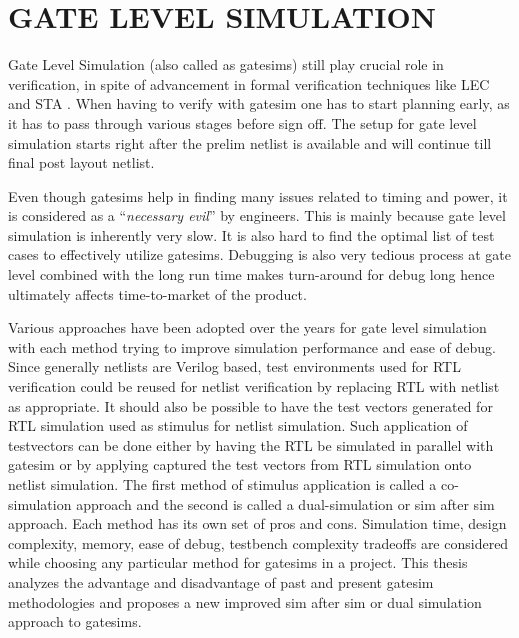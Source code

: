 \section{GATE LEVEL SIMULATION}

Gate Level Simulation (also called as gatesims) still play crucial role in verification, in spite of advancement in formal verification techniques like LEC  and STA .   When having to verify with gatesim one has to start planning early, as it has to pass through various stages before sign off. The setup for gate level simulation starts right after the prelim netlist is available and will continue till final post layout netlist.  

Even though gatesims help in finding many issues related to timing and power, it is considered as a ``{\it necessary evil}'' by engineers. This is mainly because gate level simulation is inherently very slow. It is also hard to find the optimal list of test cases to effectively utilize gatesims. Debugging is also very tedious process at gate level combined with the long run time makes turn-around for debug long hence ultimately affects time-to-market of the product.

Various approaches have been adopted over the years for gate level simulation with each method trying to improve simulation performance and ease of debug. Since generally netlists are Verilog based, test environments used for RTL verification could be reused for netlist verification by replacing RTL with netlist as appropriate. It should also be possible to have the test vectors generated for RTL simulation used as stimulus for netlist simulation. Such application of testvectors can be done either by having the RTL be simulated in parallel with gatesim or by applying captured the test vectors from RTL simulation onto netlist simulation. The first method of stimulus application is called a co-simulation approach and the second is called a dual-simulation or sim after sim approach. Each method has its own set of pros and cons. Simulation time, design complexity, memory, ease of debug, testbench complexity tradeoffs are considered while choosing any particular method for gatesims in a project. This thesis analyzes the advantage and disadvantage of past and present gatesim methodologies and  proposes a new improved sim after sim or dual simulation approach to gatesims. 



